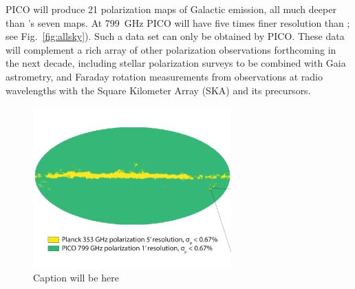 \documentclass[PICOAPC.tex]{subfiles}
\begin{document}
PICO will produce 21 polarization maps of Galactic emission, all much deeper than \planck 's seven maps. At 799~GHz PICO will have five times finer resolution than \planck ; see Fig.~\ref{fig:allsky}). Such a data set can only be obtained by PICO. These data will complement a rich array of other polarization observations forthcoming in the next decade, including stellar polarization surveys to be combined with Gaia astrometry, and Faraday rotation measurements from  observations at radio wavelengths with the  Square Kilometer Array (SKA) and its precursors. \\

 \begin{figure}[h]
 \vspace{-0.22in}
\hspace{0.2in}
\parbox{2.7in}{\centerline {
\includegraphics[width=3.0in]{galsci_fig_v4_cropped.pdf} } }
\hspace{0.in}
\parbox{3.8in}{
\caption{\captiontext Caption will be here
\label{fig:fom} } }
\vspace{-0.23in}
\end{figure}
\end{document}
